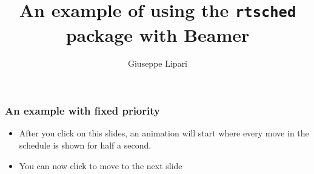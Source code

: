 \documentclass{beamer}
\title{An example of using the \texttt{rtsched} package with Beamer}
\author{Giuseppe Lipari}
\institute[Scuola Superiore Sant'Anna]{Scuola Superiore Sant'Anna -- Pisa}
\begin{document}
\begin{frame}
  \titlepage
\end{frame}

\begin{frame}
  \frametitle{An example with fixed priority}
  \begin{itemize}
  \item After you click on this slides, an animation will start where
    every move in the schedule is shown for half a second.
  \end{itemize}
  \begin{figure}
    \centering
    \begin{RTGrid}[width=.7\textwidth]{2}{20}


      
      
    \end{RTGrid}
  \end{figure}
  \begin{itemize}
  \item<+-> You can now click to move to the next slide
  \end{itemize}
\end{frame}
\end{document}
